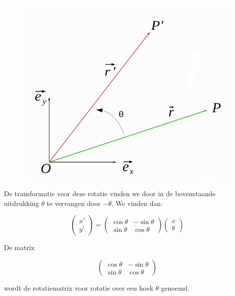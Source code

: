 \begin{figure}[h]
	\begin{center}
		\includegraphics[scale=0.5]{5_vglen_ongelijkheden_stelsels_matrices/inputs/matrices-fig-3}
	\end{center}
\end{figure}

De transformatie voor deze rotatie vinden we door in de bovenstaande uitdrukking $\theta$ te vervangen door $-\theta$. We vinden dan:

\[
\left( \begin{array}{l} x' \\ y' \end{array} \right)= \left( \begin{array}{rr} \cos \theta & -\sin \theta \\ \sin \theta & \cos \theta \end{array} \right) \left( \begin{array}{l} x \\ y \end{array} \right) 
\]

De matrix

\[
\left( \begin{array}{rr} \cos \theta & -\sin \theta \\ \sin \theta & \cos \theta \end{array} \right)
\]

wordt de rotatiematrix voor rotatie over een hoek $\theta$ genoemd.\\

